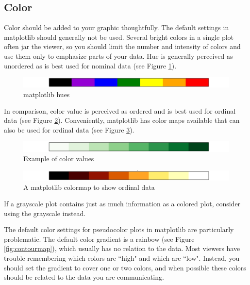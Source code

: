 \subsection*{Color}

Color should be added to your graphic thoughtfully. 
The default settings in matplotlib should generally not be used. 
Several bright colors in a single plot often jar the viewer, so you should limit the number and intensity of colors and use them only to emphasize parts of your data. 
Hue is generally perceived as unordered as is best used for nominal data (see Figure \ref{fig:hues}). 
\begin{figure}[h]
\centering
\includegraphics[width=\textwidth]{hue.png}
\caption{matplotlib hues}
\label{fig:hues}
\end{figure}

In comparison, color value is perceived as ordered and is best used for ordinal data (see Figure \ref{fig:colorvals}).  Conveniently, matplotlib has color maps available that can also be used for ordinal data (see Figure \ref{fig:colormap}). 

\begin{figure}
\centering
\includegraphics[width=\textwidth]{color_value.png}
\caption{Example of color values}
\label{fig:colorvals}
\end{figure}


\begin{figure}
\centering
\includegraphics[width=\textwidth]{color_map.png}
\caption{A matplotlib colormap to show ordinal data}
\label{fig:colormap}
\end{figure}

If a grayscale plot contains just as much information as a colored plot, consider using the grayscale instead.

The default color settings for pseudocolor plots in matplotlib are particularly problematic. 
The default color gradient is a rainbow (see Figure \ref{fig:contourmap}), which usually has no relation to the data. 
Most viewers have trouble remembering which colors are ``high" and which are ``low". 
Instead, you should set the gradient to cover one or two colors, and when possible these colors should be related to the data you are communicating. 

